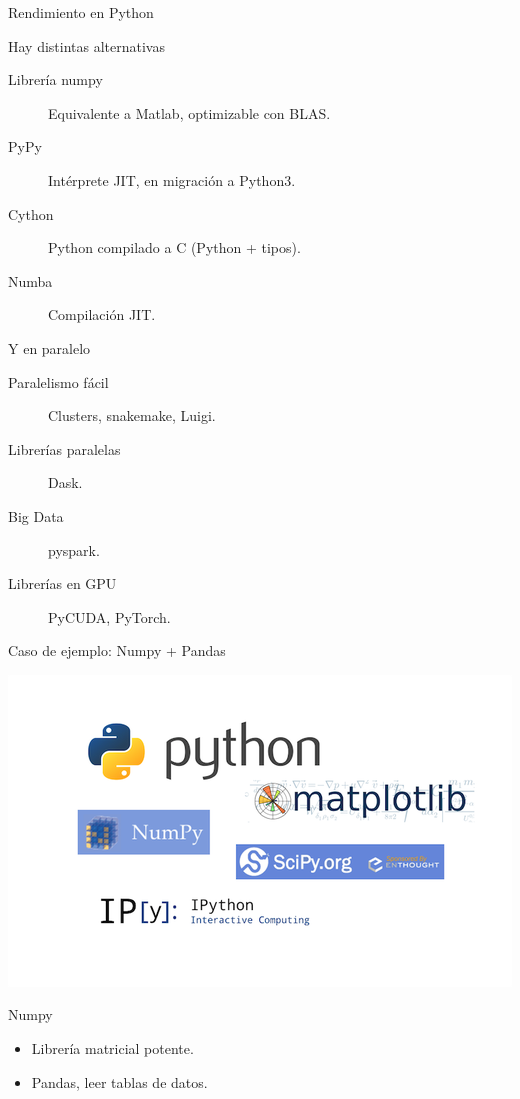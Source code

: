 \documentclass[bigger,unknownkeysallowed]{beamer}
\begin{document}
\begin{frame}[label={sec:orge0c4007}]{Rendimiento en Python}
\begin{block}{Hay distintas alternativas}
\begin{description}
\item[{Librería numpy}] Equivalente a Matlab, optimizable con BLAS.

\item[{PyPy}] Intérprete JIT, en migración a Python3.

\item[{Cython}] Python compilado a C (Python + tipos).

\item[{Numba}] Compilación JIT.
\end{description}
\end{block}

\begin{block}{Y en paralelo}
\begin{description}
\item[{Paralelismo fácil}] Clusters, snakemake, Luigi.

\item[{Librerías paralelas}] Dask.

\item[{Big Data}] pyspark.

\item[{Librerías en GPU}] PyCUDA, PyTorch.
\end{description}
\end{block}
\end{frame}

\begin{frame}[label={sec:orge1a0ceb}]{Caso de ejemplo: Numpy + Pandas}
\begin{center}
\begin{center}
\includegraphics[width=.7\textwidth]{python_numpy.png}
\end{center}
\end{center}

\begin{block}{Numpy}
\begin{itemize}
\item Librería matricial potente.

\item Pandas, leer tablas de datos.
\end{itemize}
\end{block}
\end{frame}
\end{document}
